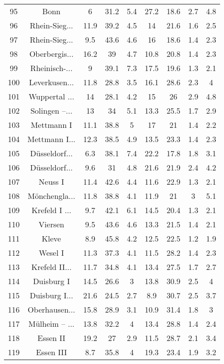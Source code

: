 \begin{table}[!htbp]
\begin{tabular}{@{\extracolsep{5pt}} ccccccccc}
95 & Bonn & 6 & 31.2 & 5.4 & 27.2 & 18.6 & 2.7 & 4.8 \\ 
96 & Rhein-Sieg... & 11.9 & 39.2 & 4.5 & 14 & 21.6 & 1.6 & 2.5 \\ 
97 & Rhein-Sieg... & 9.5 & 43.6 & 4.6 & 16 & 18.6 & 1.4 & 2.3 \\ 
98 & Oberbergis... & 16.2 & 39 & 4.7 & 10.8 & 20.8 & 1.4 & 2.3 \\ 
99 & Rheinisch-... & 9 & 39.1 & 7.3 & 17.5 & 19.6 & 1.3 & 2.1 \\ 
100 & Leverkusen... & 11.8 & 28.8 & 3.5 & 16.1 & 28.6 & 2.3 & 4 \\ 
101 & Wuppertal ... & 14 & 28.1 & 4.2 & 15 & 26 & 2.9 & 4.8 \\ 
102 & Solingen –... & 13 & 34 & 5.1 & 13.3 & 25.5 & 1.7 & 2.9 \\ 
103 & Mettmann I & 11.1 & 38.8 & 5 & 17 & 21 & 1.4 & 2.2 \\ 
104 & Mettmann I... & 12.3 & 38.5 & 4.9 & 13.5 & 23.3 & 1.4 & 2.3 \\ 
105 & Düsseldorf... & 6.3 & 38.1 & 7.4 & 22.2 & 17.8 & 1.8 & 3.1 \\ 
106 & Düsseldorf... & 9.6 & 31 & 4.8 & 21.6 & 21.9 & 2.4 & 4.2 \\ 
107 & Neuss I & 11.4 & 42.6 & 4.4 & 11.6 & 22.9 & 1.3 & 2.1 \\ 
108 & Mönchengla... & 11.8 & 38.8 & 4.1 & 11.9 & 21 & 3 & 5.1 \\ 
109 & Krefeld I ... & 9.7 & 42.1 & 6.1 & 14.5 & 20.4 & 1.3 & 2.1 \\ 
110 & Viersen & 9.5 & 43.6 & 4.6 & 13.3 & 21.5 & 1.4 & 2.1 \\ 
111 & Kleve & 8.9 & 45.8 & 4.2 & 12.5 & 22.5 & 1.2 & 1.9 \\ 
112 & Wesel I & 11.3 & 37.3 & 4.1 & 11.5 & 28.2 & 1.4 & 2.3 \\ 
113 & Krefeld II... & 11.7 & 34.8 & 4.1 & 13.4 & 27.5 & 1.7 & 2.7 \\ 
114 & Duisburg I & 14.5 & 26.6 & 3 & 13.8 & 30.9 & 2.5 & 4 \\ 
115 & Duisburg I... & 21.6 & 24.5 & 2.7 & 8.9 & 30.7 & 2.5 & 3.7 \\ 
116 & Oberhausen... & 15.8 & 28.9 & 3.1 & 10.9 & 31.4 & 1.8 & 3 \\ 
117 & Mülheim – ... & 13.8 & 32.2 & 4 & 13.4 & 28.8 & 1.4 & 2.4 \\ 
118 & Essen II & 19.2 & 27 & 2.9 & 11.5 & 28.7 & 2.1 & 3.4 \\ 
119 & Essen III & 8.7 & 35.8 & 4 & 19.3 & 23.4 & 1.9 & 3.2 \\ 

\end{tabular}
\end{table}
